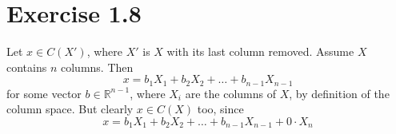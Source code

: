 \section*{Exercise 1.8}
Let $x\in C(X')$, where $X'$ is $X$ with its last column removed. Assume $X$ contains $n$ columns. Then $$x = b_1X_1 + b_2X_2 + \ldots + b_{n-1}X_{n-1}$$ for some vector $b\in \mathbb{R}^{n-1}$, where $X_i$ are the columns of $X$, by definition of the column space. But clearly $x \in C(X)$ too, since $$x = b_1X_1 + b_2X_2 + \ldots + b_{n-1}X_{n-1} + 0\cdot X_n$$
 
